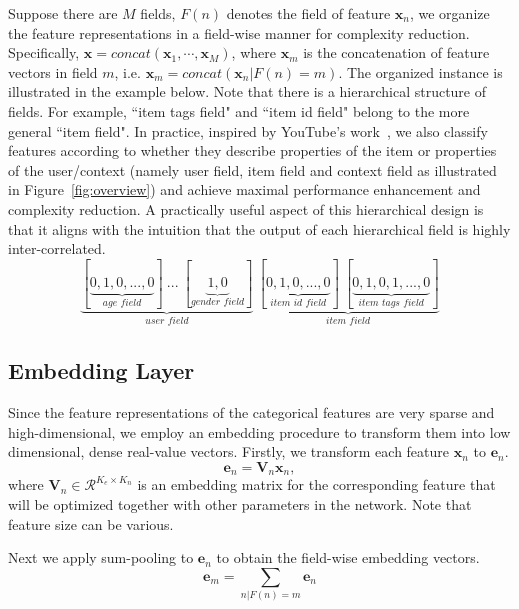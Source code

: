 \documentclass[sigconf]{acmart}
\newcommand{\Real}{\mathcal{R}}
\begin{document}
Suppose there are $M$ fields, $F(n)$ denotes the field of feature $\mathbf{x}_n$, we organize the feature representations in a field-wise manner for complexity reduction. 
Specifically, $\mathbf{x}=concat(\mathbf{x}_1,\cdots,\mathbf{x}_M)$, where $\mathbf{x}_m$ is the concatenation of feature vectors in field $m$, i.e. $\mathbf{x}_m=concat(\mathbf{x}_n| F(n)=m)$. 
The organized instance is illustrated in the example below. Note that there is a hierarchical structure of fields. For example, ``item tags field" and ``item id field" belong to the more general ``item field". 
In practice, inspired by YouTube's work~\citep{covington2016deep}, we also classify features according to whether they describe properties of the item or properties of the user/context (namely user field, item field and context field as illustrated in Figure~\ref{fig:overview}) and achieve maximal performance enhancement and complexity reduction. A practically useful aspect of this hierarchical design is that it aligns with the intuition that the output of each hierarchical field is highly inter-correlated.
\begin{equation*}
    \underbrace{[\underbrace{0,1,0,...,0}_{\textit{age field}}]\ ... \ [\underbrace{1,0}_{\textit{gender field}}]}_{\textit{user field}}\ \underbrace{[\underbrace{0,1,0,...,0}_{\textit{item id field}}]\ [\underbrace{0,1,0,1,...,0}_{\textit{item tags field}}]}_{\textit{item field}}
\end{equation*} 

\subsection{Embedding Layer}\label{sec:embedding}
Since the feature representations of the categorical features are very sparse and high-dimensional, we employ an embedding procedure to transform them into low dimensional, dense real-value vectors. 
Firstly, we transform each feature $\mathbf{x}_n$ to $\mathbf{e}_n$.   
\begin{equation}
\mathbf{e}_n = \mathbf{V}_{n}\mathbf{x}_n, 
\end{equation}
where $\mathbf{V}_{n}\in\Real^{K_e \times K_n } $ is an embedding matrix for the corresponding feature that will be optimized together with other parameters in the network. Note that feature size can be various. 

Next we apply sum-pooling to $\mathbf{e}_n$ to obtain the field-wise embedding vectors. 
\begin{equation}
\mathbf{e}_m = \sum_{n|F(n)=m}\mathbf{e}_n
\end{equation}
\end{document}
